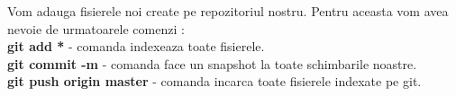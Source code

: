 \tab Vom adauga fisierele noi create pe repozitoriul nostru. Pentru aceasta vom avea nevoie de
urmatoarele comenzi :\\
\textbf{git add *} - comanda indexeaza toate fisierele.\\
\textbf{git commit -m} - comanda face un snapshot la toate schimbarile noastre.\\
\textbf{git push origin master} - comanda incarca toate fisierele indexate pe git.
